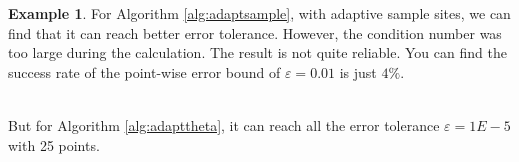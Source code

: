 \documentclass[]{mcom-l}
\theoremstyle{plain}
\theoremstyle{definition}
\newtheorem{example}{Example}
\begin{document}
\begin{example}
	For Algorithm \ref{alg:adaptsample}, with adaptive sample sites, we can find that it can reach better error tolerance. However, the condition number was too large during the calculation. The result is not quite reliable. You can find the success rate of the point-wise error bound of $\varepsilon =0.01$ is just $4\%$.
		
	\\
	
But for Algorithm \ref{alg:adapttheta}, it can reach all the error tolerance $\varepsilon = 1E-5$ with 25 points.
	
	
\end{example}
\end{document}
